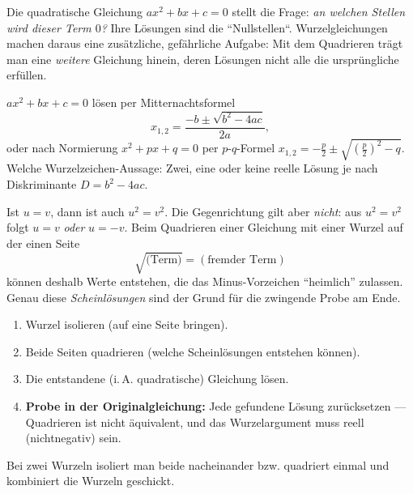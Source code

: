 


Die quadratische Gleichung $ax^2+bx+c=0$ stellt die Frage: \emph{an
welchen Stellen wird dieser Term $0$?} Ihre Lösungen sind die
``Nullstellen``. Wurzelgleichungen machen daraus eine zusätzliche,
gefährliche Aufgabe: Mit dem Quadrieren trägt man eine \emph{weitere}
Gleichung hinein, deren Lösungen nicht alle die ursprüngliche erfüllen.

\begin{werkzeugkasten}
$ax^2+bx+c=0$ lösen per Mitternachtsformel
\begin{equation}
  x_{1,2}=\frac{-b\pm\sqrt{b^2-4ac}}{2a},
\end{equation}
oder nach Normierung $x^2+px+q=0$ per $p$-$q$-Formel
$x_{1,2}=-\frac p2\pm\sqrt{\left(\frac p2\right)^2-q}$.
Welche Wurzelzeichen-Aussage: Zwei, eine oder keine reelle Lösung je nach
Diskriminante $D=b^2-4ac$.
\end{werkzeugkasten}

\begin{werkzeugkasten}
Ist $u=v$, dann ist auch $u^2=v^2$. Die Gegenrichtung gilt aber
\emph{nicht}: aus $u^2=v^2$ folgt $u=v$ \emph{oder} $u=-v$. Beim
Quadrieren einer Gleichung mit einer Wurzel auf der einen Seite
\begin{equation}
  \sqrt{\text{(Term)}}=(\text{fremder Term})
\end{equation}
können deshalb Werte entstehen, die das Minus-Vorzeichen ``heimlich''
zulassen. Genau diese \emph{Scheinlösungen} sind der Grund für die
zwingende Probe am Ende.
\end{werkzeugkasten}

\begin{werkzeugkasten}
\begin{enumerate}
  \item Wurzel isolieren (auf eine Seite bringen).
  \item Beide Seiten quadrieren (welche Scheinlösungen entstehen können).
  \item Die entstandene (i.\,A. quadratische) Gleichung lösen.
  \item \textbf{Probe in der Originalgleichung:} Jede gefundene Lösung
        zurücksetzen --- Quadrieren ist nicht äquivalent, und das
        Wurzelargument muss reell (nichtnegativ) sein.
\end{enumerate}
Bei zwei Wurzeln isoliert man beide nacheinander bzw. quadriert einmal
und kombiniert die Wurzeln geschickt.
\end{werkzeugkasten}

